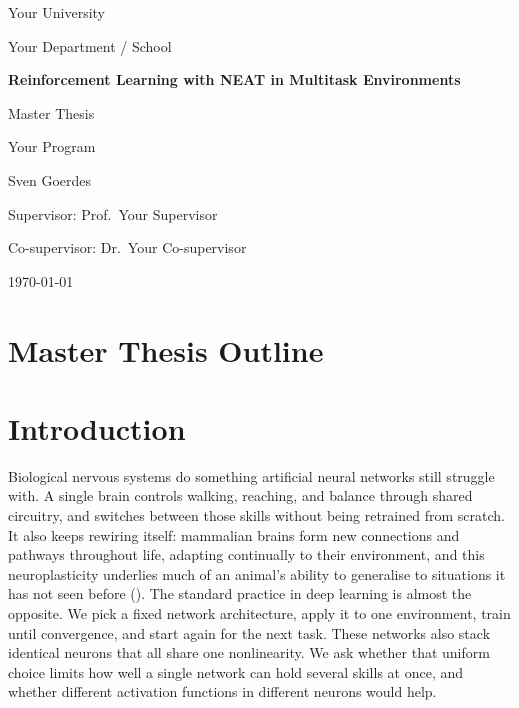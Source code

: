 \documentclass[12pt]{article}
\newcommand{\ThesisTitle}{Reinforcement Learning with NEAT in Multitask Environments}
\newcommand{\ThesisAuthor}{Sven Goerdes}
\newcommand{\ThesisDegree}{Master Thesis}
\newcommand{\ThesisProgram}{Your Program}
\newcommand{\ThesisUniversity}{Your University}
\newcommand{\ThesisDepartment}{Your Department / School}
\newcommand{\ThesisSupervisor}{Supervisor: Prof.\ Your Supervisor}
\newcommand{\ThesisCoSupervisor}{Co-supervisor: Dr.\ Your Co-supervisor}
\newcommand{\ThesisDate}{\today}
\begin{document}
\begin{titlepage}
  \thispagestyle{empty}
  \centering

  {\Large \ThesisUniversity\par}
  {\large \ThesisDepartment\par}
  \vfill

  {\LARGE\bfseries \ThesisTitle\par}
  \vspace{1.5cm}

  {\large \ThesisDegree\par}
  {\large \ThesisProgram\par}
  \vfill

  {\large \ThesisAuthor\par}
  \vspace{0.5cm}
  {\large \ThesisSupervisor\par}
  {\large \ThesisCoSupervisor\par}
  \vfill

  {\large \ThesisDate\par}
\end{titlepage}

\section*{Master Thesis Outline}

\tableofcontents

\bigskip

\newpage

\newpage

\section{Introduction}
\label{sec:introduction}

Biological nervous systems do something artificial neural networks still struggle with.
A single brain controls walking, reaching, and balance through shared circuitry, and switches between those skills without being retrained from scratch.
It also keeps rewiring itself: mammalian brains form new connections and pathways throughout life, adapting continually to their environment, and this neuroplasticity underlies much of an animal's ability to generalise to situations it has not seen before (\cite{pascual-leone_plastic_2005}).
The standard practice in deep learning is almost the opposite.
We pick a fixed network architecture, apply it to one environment, train until convergence, and start again for the next task.
These networks also stack identical neurons that all share one nonlinearity.
We ask whether that uniform choice limits how well a single network can hold several skills at once, and whether different activation functions in different neurons would help.
\end{document}
